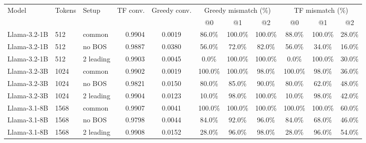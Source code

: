 \begin{tabular}{lll r c ccc ccc}
\toprule
Model & Tokens & Setup & TF conv. & Greedy conv. & \multicolumn{3}{c}{Greedy mismatch (\%)} & \multicolumn{3}{c}{TF mismatch (\%)} \\
\cmidrule(lr){6-8} \cmidrule(lr){9-11}
 &  &  &  &  & @0 & @1 & @2 & @0 & @1 & @2 \\
\midrule
Llama-3.2-1B & 512 & common & 0.9904 & 0.0019 & 86.0\% & 100.0\% & 100.0\% & 88.0\% & 100.0\% & 28.0\% \\
Llama-3.2-1B & 512 & no BOS & 0.9887 & 0.0380 & 56.0\% & 72.0\% & 82.0\% & 56.0\% & 34.0\% & 16.0\% \\
Llama-3.2-1B & 512 & 2 leading & 0.9903 & 0.0045 & 0.0\% & 100.0\% & 100.0\% & 0.0\% & 100.0\% & 30.0\% \\
\midrule
Llama-3.2-3B & 1024 & common & 0.9902 & 0.0019 & 100.0\% & 100.0\% & 98.0\% & 100.0\% & 98.0\% & 36.0\% \\
Llama-3.2-3B & 1024 & no BOS & 0.9821 & 0.0150 & 80.0\% & 85.0\% & 90.0\% & 80.0\% & 62.0\% & 48.0\% \\
Llama-3.2-3B & 1024 & 2 leading & 0.9904 & 0.0123 & 10.0\% & 98.0\% & 100.0\% & 10.0\% & 98.0\% & 42.0\% \\
\midrule
Llama-3.1-8B & 1568 & common & 0.9907 & 0.0041 & 100.0\% & 100.0\% & 100.0\% & 100.0\% & 100.0\% & 60.0\% \\
Llama-3.1-8B & 1568 & no BOS & 0.9798 & 0.0044 & 84.0\% & 92.0\% & 96.0\% & 84.0\% & 68.0\% & 46.0\% \\
Llama-3.1-8B & 1568 & 2 leading & 0.9908 & 0.0152 & 28.0\% & 96.0\% & 98.0\% & 28.0\% & 96.0\% & 54.0\% \\
\bottomrule
\end{tabular}
